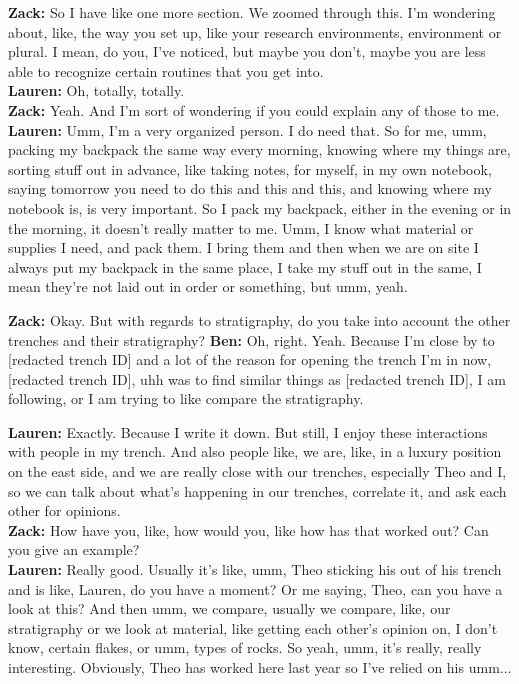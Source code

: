 \begin{arefs}
\item\label{A10}
\textbf{Zack:} So I have like one more section. We zoomed through this. I'm wondering about, like, the way you set up, like your research environments, environment or plural. I mean, do you, I've noticed, but maybe you don't, maybe you are less able to recognize certain routines that you get into.\\
\textbf{Lauren:} Oh, totally, totally.\\
\textbf{Zack:} Yeah. And I'm sort of wondering if you could explain any of those to me.\\
\textbf{Lauren:} Umm, I'm a very organized person. I do need that. So for me, umm, packing my backpack the same way every morning, knowing where my things are, sorting stuff out in advance, like taking notes, for myself, in my own notebook, saying tomorrow you need to do this and this and this, and knowing where my notebook is, is very important. So I pack my backpack, either in the evening or in the morning, it doesn't really matter to me. Umm, I know what material or supplies I need, and pack them. I bring them and then when we are on site I always put my backpack in the same place, I take my stuff out in the same, I mean they're not laid out in order or something, but umm, yeah.


\item\label{A11}
\textbf{Zack:} Okay. But with regards to stratigraphy, do you take into account the other trenches and their stratigraphy?
\textbf{Ben:} Oh, right. Yeah. Because I'm close by to [redacted trench ID] and a lot of the reason for opening the trench I'm in now, [redacted trench ID], uhh was to find similar things as [redacted trench ID], I am following, or I am trying to like compare the stratigraphy.

\item\label{A12}
\textbf{Lauren:} Exactly. Because I write it down. But still, I enjoy these interactions with people in my trench. And also people like, we are, like, in a luxury position on the east side, and we are really close with our trenches, especially Theo and I, so we can talk about what's happening in our trenches, correlate it, and ask each other for opinions.\\
\textbf{Zack:} How have you, like, how would you, like how has that worked out? Can you give an example?\\
\textbf{Lauren:} Really good. Usually it's like, umm, Theo sticking his out of his trench and is like, Lauren, do you have a moment? Or me saying, Theo, can you have a look at this? And then umm, we compare, usually we compare, like, our stratigraphy or we look at material, like getting each other's opinion on, I don't know, certain flakes, or umm, types of rocks. So yeah, umm, it's really, really interesting. Obviously, Theo has worked here last year so I've relied on his umm...


\end{arefs}

